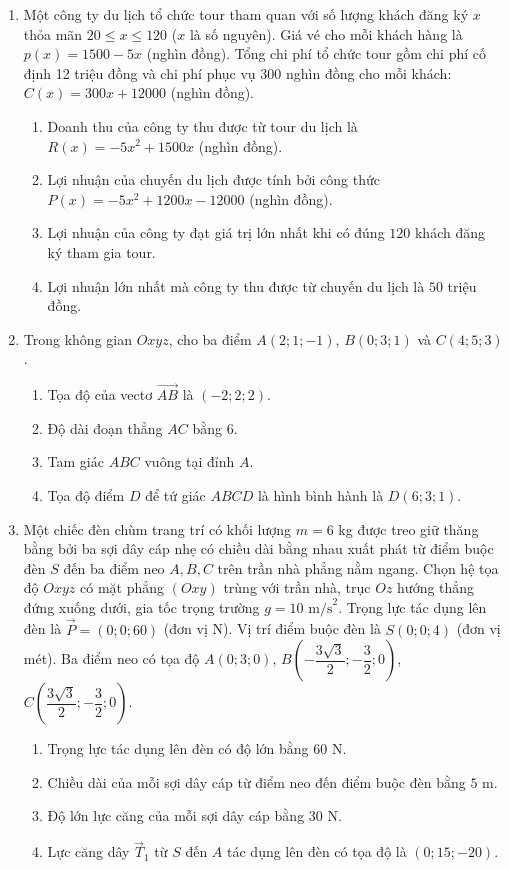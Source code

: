 \documentclass[12pt,a4paper]{article}
\begin{document}
\newpage
\begin{enumerate}[start=2]
\item Một công ty du lịch tổ chức tour tham quan với số lượng khách đăng ký $x$ thỏa mãn $20\le x\le120$ ($x$ là số nguyên). Giá vé cho mỗi khách hàng là $p(x)=1500-5x$ (nghìn đồng). Tổng chi phí tổ chức tour gồm chi phí cố định 12 triệu đồng và chi phí phục vụ $300$ nghìn đồng cho mỗi khách: $C(x)=300x+12000$ (nghìn đồng).
\begin{enumerate}
\item Doanh thu của công ty thu được từ tour du lịch là $R(x)=-5x^2+1500x$ (nghìn đồng).
\item Lợi nhuận của chuyến du lịch được tính bởi công thức $P(x)=-5x^2+1200x-12000$ (nghìn đồng).
\item Lợi nhuận của công ty đạt giá trị lớn nhất khi có đúng $120$ khách đăng ký tham gia tour.
\item Lợi nhuận lớn nhất mà công ty thu được từ chuyến du lịch là $50$ triệu đồng.
\end{enumerate}

\item Trong không gian $Oxyz$, cho ba điểm $A(2;1;-1)$, $B(0;3;1)$ và $C(4;5;3)$.
\begin{enumerate}
\item Tọa độ của vectơ $\overrightarrow{AB}$ là $(-2;2;2)$.
\item Độ dài đoạn thẳng $AC$ bằng $6$.
\item Tam giác $ABC$ vuông tại đỉnh $A$.
\item Tọa độ điểm $D$ để tứ giác $ABCD$ là hình bình hành là $D(6;3;1)$.
\end{enumerate}

\item Một chiếc đèn chùm trang trí có khối lượng $m=6$ kg được treo giữ thăng bằng bởi ba sợi dây cáp nhẹ có chiều dài bằng nhau xuất phát từ điểm buộc đèn $S$ đến ba điểm neo $A,B,C$ trên trần nhà phẳng nằm ngang. Chọn hệ tọa độ $Oxyz$ có mặt phẳng $(Oxy)$ trùng với trần nhà, trục $Oz$ hướng thẳng đứng xuống dưới, gia tốc trọng trường $g=10\text{ m/s}^2$. Trọng lực tác dụng lên đèn là $\vec P=(0;0;60)$ (đơn vị N). Vị trí điểm buộc đèn là $S(0;0;4)$ (đơn vị mét). Ba điểm neo có tọa độ $A(0;3;0)$, $B\left(-\dfrac{3\sqrt3}{2};-\dfrac{3}{2};0\right)$, $C\left(\dfrac{3\sqrt3}{2};-\dfrac{3}{2};0\right)$.
\begin{enumerate}
\item Trọng lực tác dụng lên đèn có độ lớn bằng $60$ N.
\item Chiều dài của mỗi sợi dây cáp từ điểm neo đến điểm buộc đèn bằng $5$ m.
\item Độ lớn lực căng của mỗi sợi dây cáp bằng $30$ N.
\item Lực căng dây $\vec T_1$ từ $S$ đến $A$ tác dụng lên đèn có tọa độ là $(0;15;-20)$.
\end{enumerate}
\end{enumerate}
\end{document}
